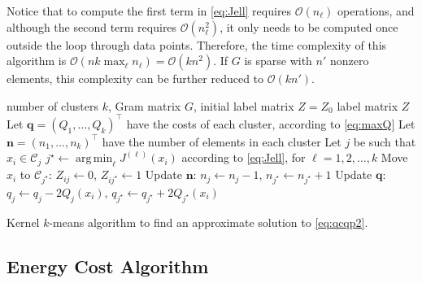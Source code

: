 \documentclass[aps,preprint,nofootinbib,floatfix]{revtex4-1}
\DeclareMathOperator*{\argmin}{arg\,min}
\newcommand\C{{\mathcal{C}}}
\newcommand\OO{{\mathcal{O}}}
\begin{document}
Notice that to compute the first term in \eqref{eq:Jell} requires
$\OO(n_\ell)$ operations, and although the second term requires
$\OO(n_\ell^2)$, it only needs to be computed once outside the loop through
data points. Therefore, the time complexity of this algorithm is
$\OO(n k \max_\ell n_\ell) = \OO(k n^2)$. If $G$ is sparse with 
$n'$ nonzero elements, this complexity can be further reduced
to $\OO(k n')$. 

\begin{algorithm}[H]
\vspace{.5em}
\begin{algorithmic}[1]
    \INPUT number of clusters $k$, Gram matrix $G$, initial label
    matrix $Z = Z_0$
    \OUTPUT label matrix $Z$ 
  \STATE Let $\bm{q} = (Q_1, \dotsc, Q_k)^\top$ 
            have the costs of each cluster, according to \eqref{eq:maxQ}
  \STATE Let $\bm{n} = (n_1,\dotsc,n_k)^\top$ have the number of elements
        in each cluster
  \REPEAT
        \STATE Let $j$ be such that $x_i \in \C_j$
        \STATE $j^\star \leftarrow \argmin_{\ell} J^{(\ell)}(x_i)$
            according to \eqref{eq:Jell}, for $\ell=1,2,\dots,k$
            \STATE Move $x_i$ to $\C_{j^\star}$: $Z_{ij} \leftarrow 0$,
            $Z_{ij^\star} \leftarrow 1$
            \STATE Update $\bm{n}$: $n_j \leftarrow n_j - 1$,
                    $n_{j^\star} \leftarrow n_{j^\star} + 1$
            \STATE Update $\bm{q}$: $q_j \leftarrow q_j - 2Q_j(x_i)$, 
    $q_{j^\star} \leftarrow q_{j^\star} + 2Q_{j^\star}(x_i)$
        \ENDIF
    \ENDFOR
\end{algorithmic}
\caption{\label{kmeans_algo}
Kernel $k$-means algorithm 
to find an approximate solution to \eqref{eq:qcqp2}.}
\end{algorithm}


\subsection{Energy Cost Algorithm}
\end{document}

